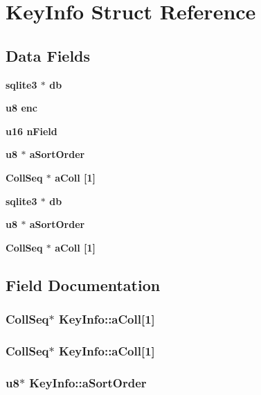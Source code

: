 \section{Key\-Info Struct Reference}
\label{structKeyInfo}
\subsection*{Data Fields}
\begin{CompactItemize}
\item 
\bf{sqlite3} $\ast$ \bf{db}
\item 
\bf{u8} \bf{enc}
\item 
\bf{u16} \bf{n\-Field}
\item 
\bf{u8} $\ast$ \bf{a\-Sort\-Order}
\item 
\bf{Coll\-Seq} $\ast$ \bf{a\-Coll} [1]
\item 
\bf{sqlite3} $\ast$ \bf{db}
\item 
\bf{u8} $\ast$ \bf{a\-Sort\-Order}
\item 
\bf{Coll\-Seq} $\ast$ \bf{a\-Coll} [1]
\end{CompactItemize}


\subsection{Field Documentation}
\subsubsection{\setlength{\rightskip}{0pt plus 5cm}\bf{Coll\-Seq}$\ast$ \bf{Key\-Info::a\-Coll}[1]}\label{structKeyInfo_f93f2afd8ba2005459a993e97c6d9785}


\subsubsection{\setlength{\rightskip}{0pt plus 5cm}\bf{Coll\-Seq}$\ast$ \bf{Key\-Info::a\-Coll}[1]}\label{structKeyInfo_f93f2afd8ba2005459a993e97c6d9785}


\subsubsection{\setlength{\rightskip}{0pt plus 5cm}\bf{u8}$\ast$ \bf{Key\-Info::a\-Sort\-Order}}\label{structKeyInfo_3282b3c9dfe1f3ee3736285874a3a0e1}


